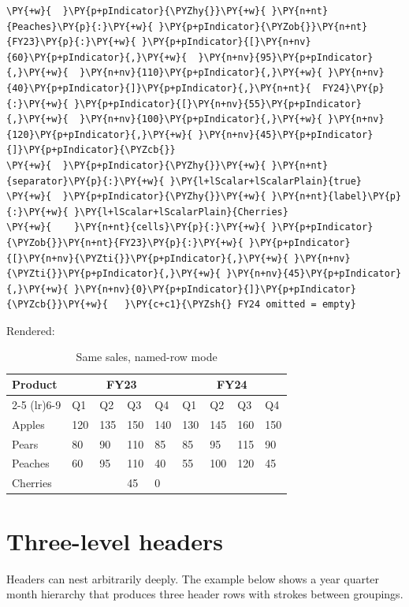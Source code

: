 \documentclass[a4paper,twoside]{article}
\begin{document}
\begin{tscode}[lang=yaml, engine=pygments]
\begin{Verbatim}[commandchars=\\\{\},breaklines, breakanywhere, commandchars=\\\{\}]
\PY{+w}{  }\PY{p+pIndicator}{\PYZhy{}}\PY{+w}{ }\PY{n+nt}{Peaches}\PY{p}{:}\PY{+w}{ }\PY{p+pIndicator}{\PYZob{}}\PY{n+nt}{FY23}\PY{p}{:}\PY{+w}{ }\PY{p+pIndicator}{[}\PY{n+nv}{60}\PY{p+pIndicator}{,}\PY{+w}{  }\PY{n+nv}{95}\PY{p+pIndicator}{,}\PY{+w}{  }\PY{n+nv}{110}\PY{p+pIndicator}{,}\PY{+w}{ }\PY{n+nv}{40}\PY{p+pIndicator}{]}\PY{p+pIndicator}{,}\PY{n+nt}{  FY24}\PY{p}{:}\PY{+w}{ }\PY{p+pIndicator}{[}\PY{n+nv}{55}\PY{p+pIndicator}{,}\PY{+w}{  }\PY{n+nv}{100}\PY{p+pIndicator}{,}\PY{+w}{ }\PY{n+nv}{120}\PY{p+pIndicator}{,}\PY{+w}{ }\PY{n+nv}{45}\PY{p+pIndicator}{]}\PY{p+pIndicator}{\PYZcb{}}
\PY{+w}{  }\PY{p+pIndicator}{\PYZhy{}}\PY{+w}{ }\PY{n+nt}{separator}\PY{p}{:}\PY{+w}{ }\PY{l+lScalar+lScalarPlain}{true}
\PY{+w}{  }\PY{p+pIndicator}{\PYZhy{}}\PY{+w}{ }\PY{n+nt}{label}\PY{p}{:}\PY{+w}{ }\PY{l+lScalar+lScalarPlain}{Cherries}
\PY{+w}{    }\PY{n+nt}{cells}\PY{p}{:}\PY{+w}{ }\PY{p+pIndicator}{\PYZob{}}\PY{n+nt}{FY23}\PY{p}{:}\PY{+w}{ }\PY{p+pIndicator}{[}\PY{n+nv}{\PYZti{}}\PY{p+pIndicator}{,}\PY{+w}{ }\PY{n+nv}{\PYZti{}}\PY{p+pIndicator}{,}\PY{+w}{ }\PY{n+nv}{45}\PY{p+pIndicator}{,}\PY{+w}{ }\PY{n+nv}{0}\PY{p+pIndicator}{]}\PY{p+pIndicator}{\PYZcb{}}\PY{+w}{   }\PY{c+c1}{\PYZsh{} FY24 omitted = empty}
\end{Verbatim}
\end{tscode}
Rendered:
\begin{table}[H]
\centering
\caption{Same sales, named-row mode}
\vspace{0.5em}
\begin{tabular}{lllllllll}
\toprule
\multirow{2}{*}{Product} & \multicolumn{4}{c}{FY23} & \multicolumn{4}{c}{FY24} \\
\cmidrule(lr){2-5} \cmidrule(lr){6-9}
& Q1 & Q2 & Q3 & Q4 & Q1 & Q2 & Q3 & Q4 \\
\midrule
Apples & 120 & 135 & 150 & 140 & 130 & 145 & 160 & 150 \\
Pears & 80 & 90 & 110 & 85 & 85 & 95 & 115 & 90 \\
Peaches & 60 & 95 & 110 & 40 & 55 & 100 & 120 & 45 \\
\midrule
Cherries &  &  & 45 & 0 &  &  &  &  \\
\bottomrule
\end{tabular}
\end{table}
\section{Three-level headers}
Headers can nest arbitrarily deeply. The example below shows a
year quarter month hierarchy that produces three header rows with
 strokes between groupings.
\end{document}
